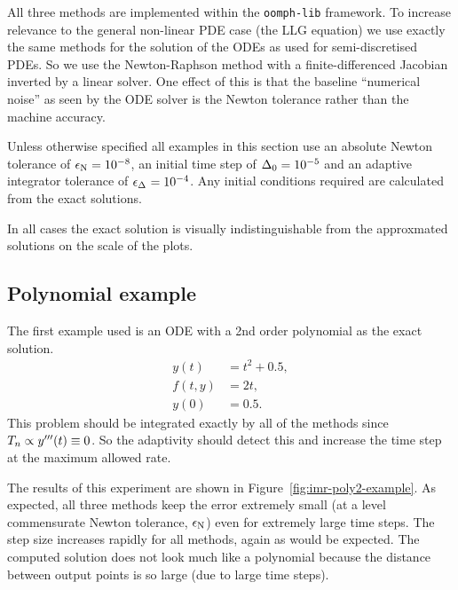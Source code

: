 All three methods are implemented within the \texttt{oomph-lib} framework.
To increase relevance to the general non-linear PDE case (\ie the LLG equation) we use exactly the same methods for the solution of the ODEs as used for semi-discretised PDEs.
So we use the Newton-Raphson method with a finite-differenced Jacobian inverted by a linear solver.
One effect of this is that the baseline ``numerical noise'' as seen by the ODE solver is the Newton tolerance rather than the machine accuracy.

Unless otherwise specified all examples in this section use an absolute Newton tolerance of $\epsilon_{\text{N}} = 10^{-8}$, an initial time step of $\Delta_{0} = 10^{-5}$ and an adaptive integrator tolerance of $\epsilon_{\Delta_{}} = 10^{-4}$.
Any initial conditions required are calculated from the exact solutions.

In all cases the exact solution is visually indistinguishable from the approxmated solutions on the scale of the plots.


\subsection{Polynomial example}
\label{sec:imr-polynomial-example}

The first example used is an ODE with a 2nd order polynomial as the exact solution.
\begin{equation}
  \label{eqn:imr-test-poly2}
  \begin{aligned}
    y(t) &= t^2 + 0.5, \\
    f(t,y) &= 2t, \\
    y(0) & = 0.5.
  \end{aligned}
\end{equation}
This problem should be integrated exactly by all of the methods since $T_n \propto y'''(t) \equiv 0$.
So the adaptivity should detect this and increase the time step at the maximum allowed rate.

The results of this experiment are shown in Figure~\ref{fig:imr-poly2-example}. 
As expected, all three methods keep the error extremely small (at a level commensurate Newton tolerance, $\epsilon_{\text{N}}$) even for extremely large time steps.
The step size increases rapidly for all methods, again as would be expected.
The computed solution does not look much like a polynomial because the distance between output points is so large (due to large time steps).

